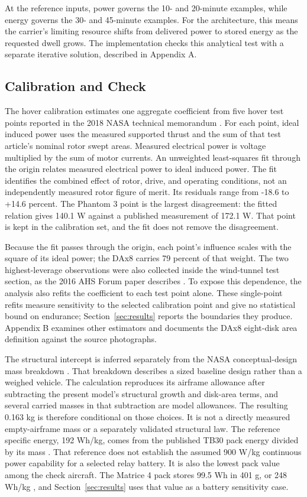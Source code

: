 \documentclass[twocolumn,letterpaper]{IEEEAerospaceCLS}
\begin{document}
At the reference inputs, power governs the 10- and 20-minute examples, while energy governs the 30- and 45-minute examples. For the architecture, this means the carrier's limiting resource shifts from delivered power to stored energy as the requested dwell grows. The implementation checks this analytical test with a separate iterative solution, described in Appendix A.

\subsection{Calibration and Check}

The hover calibration estimates one aggregate coefficient from five hover test points reported in the 2018 NASA technical memorandum \cite{nasatm}. For each point, ideal induced power uses the measured supported thrust and the sum of that test article's nominal rotor swept areas. Measured electrical power is voltage multiplied by the sum of motor currents. An unweighted least-squares fit through the origin relates measured electrical power to ideal induced power. The fit identifies the combined effect of rotor, drive, and operating conditions, not an independently measured rotor figure of merit. Its residuals range from -18.6 to +14.6 percent. The Phantom 3 point is the largest disagreement: the fitted relation gives 140.1 W against a published measurement of 172.1 W. That point is kept in the calibration set, and the fit does not remove the disagreement.

Because the fit passes through the origin, each point's influence scales with the square of its ideal power; the DAx8 carries 79 percent of that weight. The two highest-leverage observations were also collected inside the wind-tunnel test section, as the 2016 AHS Forum paper describes \cite{russell2016}. To expose this dependence, the analysis also refits the coefficient to each test point alone. These single-point refits measure sensitivity to the selected calibration point and give no statistical bound on endurance; Section~\ref{sec:results} reports the boundaries they produce. Appendix B examines other estimators and documents the DAx8 eight-disk area definition against the source photographs.

The structural intercept is inferred separately from the NASA conceptual-design mass breakdown \cite{russell2018}. That breakdown describes a sized baseline design rather than a weighed vehicle. The calculation reproduces its airframe allowance after subtracting the present model's structural growth and disk-area terms, and several carried masses in that subtraction are model allowances. The resulting 0.163 kg is therefore conditional on those choices. It is not a directly measured empty-airframe mass or a separately validated structural law. The reference specific energy, 192 Wh/kg, comes from the published TB30 pack energy divided by its mass \cite{djim30}. That reference does not establish the assumed 900 W/kg continuous power capability for a selected relay battery. It is also the lowest pack value among the check aircraft. The Matrice 4 pack stores 99.5 Wh in 401 g, or 248 Wh/kg \cite{djim4}, and Section~\ref{sec:results} uses that value as a battery sensitivity case.
\end{document}
